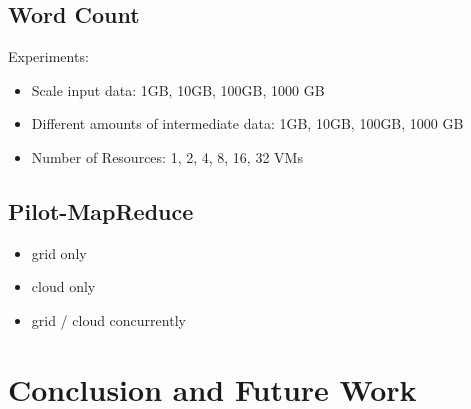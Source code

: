 \documentclass[times]{cpeauth}
\begin{document}
	
\subsection{Word Count}

Experiments:
\begin{itemize}
	\item  Scale input data: 1GB, 10GB, 100GB, 1000 GB
	\item  Different amounts of intermediate data: 1GB, 10GB, 100GB, 1000 GB
	\item  Number of Resources: 1, 2, 4, 8, 16, 32 VMs
\end{itemize}

\subsection{Pilot-MapReduce}
\begin{itemize}
	\item grid only
	\item cloud only
	\item grid / cloud concurrently
\end{itemize}

\section{Conclusion and Future Work}



\end{document}
